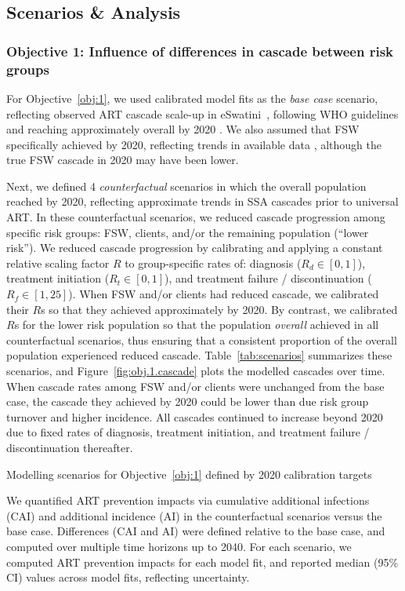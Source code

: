 \subsection{Scenarios \& Analysis}\label{meth.ana}
\subsubsection{Objective 1: Influence of differences in cascade between risk groups}\label{meth.obj.1}
For Objective~\ref{obj:1},
we used calibrated model fits as the \emph{base case} scenario, reflecting
observed ART cascade scale-up in eSwatini~\cite{SDHS2006,SHIMS1,SHIMS2},
following WHO guidelines and reaching approximately \cashigh overall by 2020 \cite{AIDSinfo}.
We also assumed that FSW specifically achieved \cashigh by 2020, reflecting
trends in available data \cite{Baral2014,EswKP2014},
although the true FSW cascade in 2020 may have been lower.
\par
Next, we defined 4 \emph{counterfactual} scenarios in which
the overall population reached \casmid by 2020,
reflecting approximate trends in SSA cascades prior to universal ART.
In these counterfactual scenarios, we reduced cascade progression among specific risk groups:
FSW, clients, and/or the remaining population (``lower risk'').
We reduced cascade progression by calibrating and applying
a constant relative scaling factor $R$ to group-specific rates of:
diagnosis ($R_d\in[0,1]$), treatment initiation ($R_t\in[0,1]$),
and treatment failure / discontinuation ($R_f\in[1,25]$).
When FSW and/or clients had reduced cascade, we calibrated their $R$s so that
they achieved approximately \caslow by 2020.
By contrast, we calibrated $R$s for the lower risk population so that
the population \emph{overall} achieved \casmid in all counterfactual scenarios,
thus ensuring that a consistent proportion of the overall population experienced reduced cascade.
Table~\ref{tab:scenarios} summarizes these scenarios,
and Figure~\ref{fig:obj.1.cascade} plots the modelled cascades over time.
When cascade rates among FSW and/or clients were unchanged from the base case,
the cascade they achieved by 2020 could be lower than \cashigh
due risk group turnover and higher incidence.
All cascades continued to increase beyond 2020 due to
fixed rates of diagnosis, treatment initiation, and treatment failure / discontinuation thereafter.
\begin{table}[b]
  \centering
  \caption{Modelling scenarios for Objective~\ref{obj:1} defined by 2020 calibration targets}
  \label{tab:scenarios}
  
\end{table}
\par
We quantified ART prevention impacts via
cumulative additional infections (CAI) and additional incidence (AI)
in the counterfactual scenarios versus the base case.
Differences (CAI and AI) were defined relative to the base case,
and computed over multiple time horizons up to 2040.
For each scenario, we computed ART prevention impacts for each model fit,
and reported median (95\% CI) values across model fits, reflecting uncertainty.
